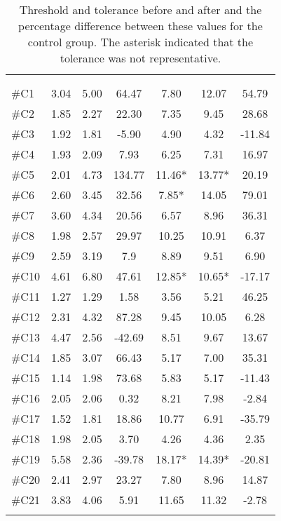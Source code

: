 \begin{longtable} {l|c|c|c|c|c|c}
 \rowcolor[HTML]{C0C0C0} 
  \color[HTML]{000000}{} & 
 \multicolumn{3}{c|}{ \color[HTML]{000000}{\textbf{Threshold}}} & \multicolumn{3}{c}{ \color[HTML]{000000}{\textbf{Tolerance}}}  	\\  \rule{0pt}{3ex} 
  \cellcolor[HTML]{C0C0C0}{} &
 \multicolumn{1}{c|}{ \cellcolor[HTML]{C0C0C0}{Pre [KgF]}} & \multicolumn{1}{c|}{ \cellcolor[HTML]{C0C0C0}{Post [KgF]}} 
 & \multicolumn{1}{c}{ \cellcolor[HTML]{C0C0C0}{\textcolor[HTML]{C0C0C0}{0}Diff [\%]\textcolor[HTML]{C0C0C0}{0}}}
 & \multicolumn{1}{|c|}{ \cellcolor[HTML]{C0C0C0}{Pre [KgF]}} 
 & \multicolumn{1}{c|}{ \cellcolor[HTML]{C0C0C0}{Post [KgF]}} 
 & \multicolumn{1}{c}{ \cellcolor[HTML]{C0C0C0}{\textcolor[HTML]{C0C0C0}{0}Diff [\%]\textcolor[HTML]{C0C0C0}{0}}}  	\\ \hline   
\#C1 & 3.04	& 5.00	&	64.47	& 7.80	& 	12.07 &	54.79\\ \hline
\#C2 & 1.85 	& 2.27	&	22.30	& 7.35	& 	9.45 & 28.68	\\ \hline
\#C3 & 1.92 	& 1.81	&	-5.90	& 4.90	& 	4.32 & -11.84	\\ \hline
\#C4 & 1.93 	& 2.09	&	7.93		& 6.25	&	7.31 & 16.97	\\ \hline
\#C5 & 2.01 	& 4.73 	& 	134.77	& 11.46* 	& 13.77* & 20.19		\\ \hline
\#C6 & 2.60 	& 3.45	& 	32.56		& 7.85*	& 14.05 & 79.01		\\ \hline	
\#C7 & 3.60 & 4.34	& 	20.56		& 6.57 & 8.96  &	36.31 \\ \hline
\#C8 & 1.98 & 2.57	& 	29.97		& 10.25	& 10.91 &	6.37	\\ \hline
\#C9 & 2.59 & 3.19 	& 	7.9		& 8.89	& 9.51 & 6.90		\\ \hline
\#C10 & 4.61 & 6.80	& 	47.61		& 12.85*	& 10.65* & -17.17 \\ \hline
\#C11 & 1.27 & 1.29 	& 	1.58		& 3.56	& 5.21 &  46.25\\ \hline
\#C12 & 2.31 & 4.32 	& 	87.28	& 9.45 & 10.05 & 6.28 \\ \hline
\#C13 & 4.47 & 2.56 	& 	-42.69	& 8.51 & 9.67 & 13.67 \\ \hline
\#C14 & 1.85 & 3.07 & 	66.43	 & 5.17 & 7.00 & 35.31 \\ \hline
\#C15 & 1.14 & 1.98 & 	73.68 & 5.83 & 5.17 & -11.43 \\ \hline
\#C16 & 2.05 & 2.06 & 	0.32 & 8.21 & 7.98 & -2.84 \\ \hline
\#C17 & 1.52 & 1.81 &	18.86 & 10.77 & 6.91 & -35.79 \\ \hline
\#C18 & 1.98 & 2.05 & 	3.70 & 4.26  &  4.36 & 2.35 \\ \hline
\#C19 & 5.58 & 2.36 & 	-39.78 & 18.17* & 14.39* & -20.81 \\ \hline
\#C20 & 2.41 & 2.97 &  23.27 & 7.80 &  8.96 & 14.87\\ \hline
\#C21 & 3.83 & 4.06 & 5.91  & 11.65 & 11.32 & -2.78 \\ \hline
	\caption{Threshold and tolerance before and after and the percentage difference between these values for the control group. The asterisk indicated that the tolerance was not representative.}
	\label{tab:Control}
\end{longtable}



